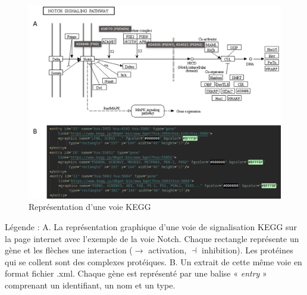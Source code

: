 \begin{figure}[H]
    \centering
    \includegraphics[width=1\textwidth]{figures/corps/figure13.png}
    \caption{Représentation d’une voie KEGG}
    \label{fig:13_kegg}
\end{figure}
Légende : A. La représentation graphique d’une voie de signalisation KEGG sur la page internet avec l’exemple de la voie Notch. Chaque rectangle représente un gène et les flèches une interaction ($\rightarrow$ activation, $\dashv$ inhibition). Les protéines qui se collent sont des complexes protéiques. B. Un extrait de cette même voie en format fichier .xml. Chaque gène est représenté par une balise « \textit{entry} » comprenant un identifiant, un nom et un type. 

